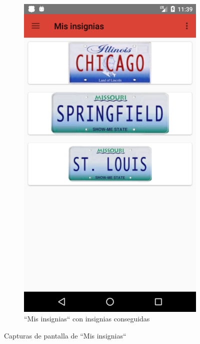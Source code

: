 \documentclass[twoside]{report}
\begin{document}
\begin{figure}[H]
\begin{center}
\begin{subfigure}[t]{.3\linewidth}
		\includegraphics[scale=0.2]{images/userguide/8.png}
		\caption{“Mis insignias“ con insignias conseguidas}
	\end{subfigure}
\caption{Capturas de pantalla de “Mis insignias“}
\end{center}
\end{figure}
\end{document}
